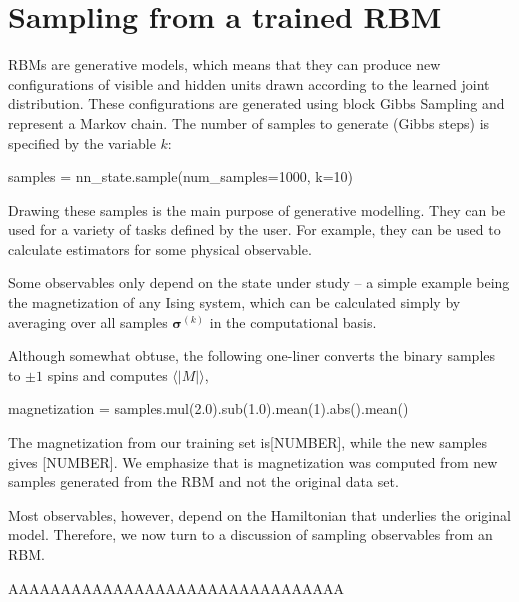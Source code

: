 \documentclass[submission, Phys]{SciPost}
\begin{document}
\section{Sampling from a trained RBM}
\label{Sec:Sampling_a-Trained_RBM}

RBMs are generative models, which means that they can produce new configurations of visible and hidden units
drawn according to the learned joint distribution.
These configurations are generated using block Gibbs Sampling and represent a Markov chain.
The number of samples to generate (Gibbs steps) is specified by the variable $k$:
\begin{python}
samples = nn_state.sample(num_samples=1000, k=10)
\end{python}

Drawing these samples is the main purpose of generative modelling. 
They can be used for a variety of tasks defined by the user.
For example, they can be used to calculate estimators for some physical observable.

Some observables only depend on the state under study -- a simple example being the magnetization of any Ising 
system, which can be calculated simply by averaging over all samples $\bm{\sigma}^{(k)}$ in the computational basis.

Although somewhat obtuse, the following one-liner converts the binary samples to $\pm 1$ spins and computes $\langle |M|\rangle$,
\begin{python}
magnetization = samples.mul(2.0).sub(1.0).mean(1).abs().mean()
\end{python}

The magnetization from our training set is[NUMBER], while the new samples gives [NUMBER].
We emphasize that is magnetization was computed from new samples generated from the RBM and not the original data set. 

Most observables, however, depend on the Hamiltonian that underlies the original model.
Therefore, we now turn to a discussion of sampling observables from an RBM.


AAAAAAAAAAAAAAAAAAAAAAAAAAAAAAAA
\end{document}
